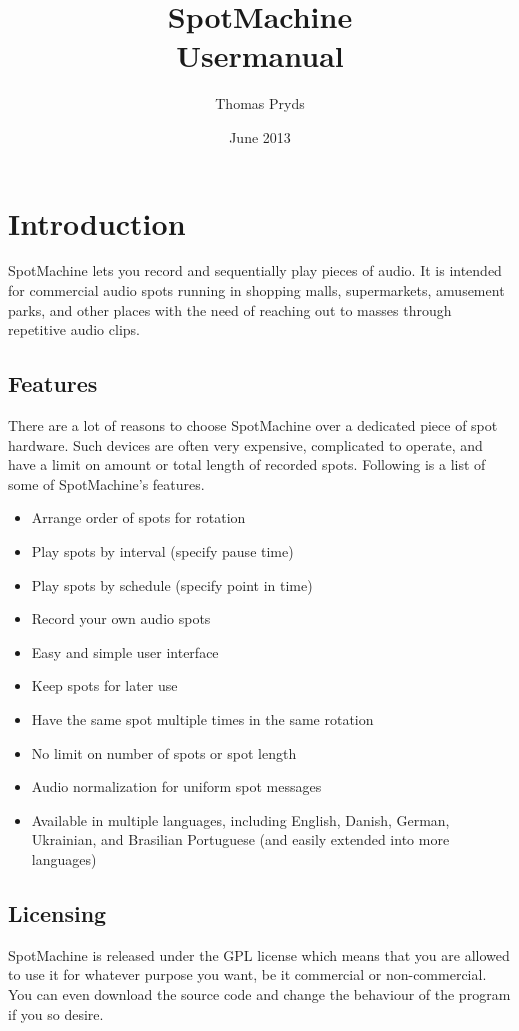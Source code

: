 \documentclass[a4paper,12pt]{report}
\title{SpotMachine \\ Usermanual}
\author{Thomas Pryds}
\date{June 2013}
\begin{document}
\maketitle

\tableofcontents

\chapter{Introduction}

SpotMachine lets you record and sequentially play pieces of audio. It is
intended for commercial audio spots running in shopping malls, supermarkets,
amusement parks, and other places with the need of reaching out to masses
through repetitive audio clips.

\section{Features}
There are a lot of reasons to choose SpotMachine over a dedicated piece of spot
hardware. Such devices are often very expensive, complicated to operate, and
have a limit on amount or total length of recorded spots. Following is a list of
some of SpotMachine's features.

\begin{itemize}
\item Arrange order of spots for rotation
\item Play spots by interval (specify pause time)
\item Play spots by schedule (specify point in time)
\item Record your own audio spots
\item Easy and simple user interface
\item Keep spots for later use
\item Have the same spot multiple times in the same rotation
\item No limit on number of spots or spot length
\item Audio normalization for uniform spot messages
\item Available in multiple languages, including English, Danish, German, Ukrainian, and Brasilian Portuguese (and easily extended into more languages)
\end{itemize}

\section{Licensing}
SpotMachine is released under the GPL license which means that you are allowed
to use it for whatever purpose you want, be it commercial or non-commercial. You
can even download the source code and change the behaviour of the program if you
so desire.
\end{document}
